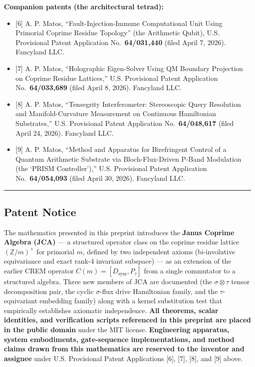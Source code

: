\documentclass[
]{article}
\providecommand{\tightlist}{%
  \setlength{\itemsep}{0pt}\setlength{\parskip}{0pt}}
\begin{document}
\textbf{Companion patents (the architectural tetrad):}

\begin{itemize}
\tightlist
\item
  {[}6{]} A. P. Matos, ``Fault-Injection-Immune Computational Unit Using
  Primorial Coprime Residue Topology'' (the Arithmetic Qubit), U.S.
  Provisional Patent Application No.~\textbf{64/031,440} (filed April 7,
  2026). Fancyland LLC.
\item
  {[}7{]} A. P. Matos, ``Holographic Eigen-Solver Using QM Boundary
  Projection on Coprime Residue Lattices,'' U.S. Provisional Patent
  Application No.~\textbf{64/033,689} (filed April 8, 2026). Fancyland
  LLC.
\item
  {[}8{]} A. P. Matos, ``Tensegrity Interferometer: Stereoscopic Query
  Resolution and Manifold-Curvature Measurement on Continuous
  Hamiltonian Substrates,'' U.S. Provisional Patent Application
  No.~\textbf{64/048,617} (filed April 24, 2026). Fancyland LLC.
\item
  {[}9{]} A. P. Matos, ``Method and Apparatus for Birefringent Control
  of a Quantum Arithmetic Substrate via Bloch-Flux-Driven P-Band
  Modulation (the `PRISM Controller'),'' U.S. Provisional Patent
  Application No.~\textbf{64/054,093} (filed April 30, 2026). Fancyland
  LLC.
\end{itemize}

\begin{center}\rule{0.5\linewidth}{0.5pt}\end{center}

\subsection{Patent Notice}\label{patent-notice}

The mathematics presented in this preprint introduces the \textbf{Janus
Coprime Algebra (JCA)} --- a structured operator class on the coprime
residue lattice \((\mathbb{Z}/m)^\times\) for primorial \(m\), defined
by two independent axioms (bi-involutive equivariance and exact rank-4
invariant subspace) --- as an extension of the earlier CREM operator
\(C(m) = [D_\text{sym}, P_\tau]\) from a single commutator to a
structured algebra. Three new members of JCA are documented (the
\(\sigma\otimes\tau\) tensor decomposition pair, the cyclic
\(\sigma\)-flux drive Hamiltonian family, and the \(\tau\)-equivariant
embedding family) along with a kernel substitution test that empirically
establishes axiomatic independence. \textbf{All theorems, scalar
identities, and verification scripts referenced in this preprint are
placed in the public domain} under the MIT license. \textbf{Engineering
apparatus, system embodiments, gate-sequence implementations, and method
claims drawn from this mathematics are reserved to the inventor and
assignee} under U.S. Provisional Patent Applications {[}6{]}, {[}7{]},
{[}8{]}, and {[}9{]} above.
\end{document}
